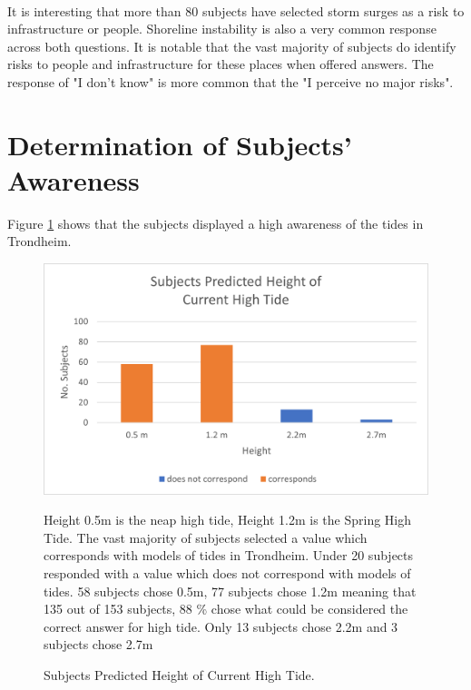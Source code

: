 \paragraph{}
It is interesting that more than 80 subjects have selected storm surges as a risk to infrastructure or people. Shoreline instability is also a very common response across both questions. It is notable that the vast majority of subjects do identify risks to people and infrastructure for these places when offered answers. The response of "I don't know" is more common that the "I perceive no major risks". 


\section{Determination of Subjects' Awareness}
Figure \ref{fig:high_tide_answer} shows that the subjects displayed a high awareness of the tides in Trondheim. 

\begin{figure}[H]
    \centering
    \includegraphics{fig_results/2022-hightide-answers.png}
    \caption{Subjects Predicted Height of Current High Tide.}{ Height 0.5m is the neap high tide, Height 1.2m is the Spring High Tide. The vast majority of subjects selected a value which corresponds with models of tides in Trondheim. Under 20 subjects responded with a value which does not correspond with models of tides. 58 subjects chose 0.5m, 77 subjects chose 1.2m meaning that 135 out of 153 subjects, 88 \% chose what could be considered the correct answer for high tide. Only 13 subjects chose 2.2m and 3 subjects chose 2.7m}
    \label{fig:high_tide_answer}
\end{figure}
\paragraph{}

